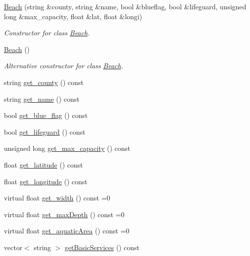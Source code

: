 \begin{DoxyCompactItemize}
\item 
\hyperlink{class_beach_addc648363a2a06c27983955cb1efe923}{Beach} (string \&county, string \&name, bool \&blueflag, bool \&lifeguard, unsigned long \&max\+\_\+capacity, float \&lat, float \&longi)
\begin{DoxyCompactList}\small\item\em Constructor for class \hyperlink{class_beach}{Beach}. \end{DoxyCompactList}\item 
\mbox{\label{class_beach_a46f93d12e0399676c648d351613976af}} 
\hyperlink{class_beach_a46f93d12e0399676c648d351613976af}{Beach} ()
\begin{DoxyCompactList}\small\item\em Alternative constructor for class \hyperlink{class_beach}{Beach}. \end{DoxyCompactList}\item 
string \hyperlink{class_beach_ac25e8defc3ad46b44c64a908994bf43c}{get\+\_\+county} () const
\item 
string \hyperlink{class_beach_ae84e85693f8377673df6e91fba4503eb}{get\+\_\+name} () const
\item 
bool \hyperlink{class_beach_a6f3155d6b2a779d27b619d87775ff62b}{get\+\_\+blue\+\_\+flag} () const
\item 
bool \hyperlink{class_beach_a34d51732d2248a9000a8e7b09e377c5b}{get\+\_\+lifeguard} () const
\item 
unsigned long \hyperlink{class_beach_a428ee21d8889b86bd05f1460a0a1be34}{get\+\_\+max\+\_\+capacity} () const
\item 
float \hyperlink{class_beach_ae31a69a1f54505904331261db15ab3b6}{get\+\_\+latitude} () const
\item 
float \hyperlink{class_beach_a129633666198d102f58fe1dc7b9f89d8}{get\+\_\+longitude} () const
\item 
virtual float \hyperlink{class_beach_af28e3603ea98766d94c9e8eb9f76d509}{get\+\_\+width} () const =0
\item 
virtual float \hyperlink{class_beach_a5942f7aa56af3b61d2974a754913ab7e}{get\+\_\+max\+Depth} () const =0
\item 
virtual float \hyperlink{class_beach_afc6a57f98777ec5de1882acaf2703e6d}{get\+\_\+aquatic\+Area} () const =0
\item 
vector$<$ string $>$ \hyperlink{class_beach_a23305808d894c08a79fa3a0d201d0c51}{get\+Basic\+Services} () const

\end{DoxyCompactItemize}
